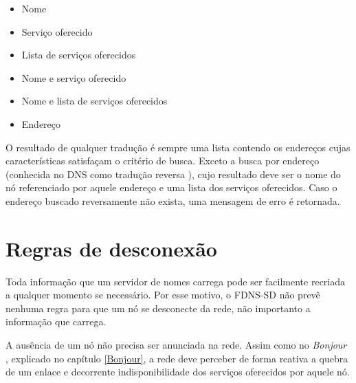     \begin{itemize}
        \item Nome
        \item Serviço oferecido
        \item Lista de serviços oferecidos
        \item Nome e serviço oferecido
        \item Nome e lista de serviços oferecidos
        \item Endereço
    \end{itemize}
    
    O resultado de qualquer tradução é sempre uma lista contendo os endereços
    cujas características satisfaçam o critério de busca. Exceto a busca por endereço
    (conhecida no DNS como tradução reversa \cite{rfc1035}), cujo resultado deve
    ser o nome do nó referenciado por aquele endereço e uma lista dos serviços
    oferecidos. Caso o endereço buscado reversamente não exista, uma mensagem de
    erro é retornada.
    
\section{Regras de desconexão}
    Toda informação que um servidor de nomes carrega pode ser facilmente recriada
    a qualquer momento se necessário. Por esse motivo, o FDNS-SD não prevê nenhuma
    regra para que um nó se desconecte da rede, não importanto a informação que
    carrega.
    
    A ausência de um nó não precisa ser anunciada na rede. Assim como no
    \textit{Bonjour} \cite{mdns}, explicado no capítulo \ref{Bonjour}, a rede
    deve perceber de forma reativa a quebra de um enlace e decorrente indisponibilidade
    dos serviços oferecidos por aquele nó.